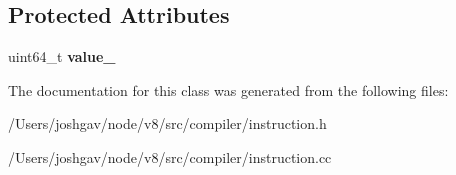 \subsection*{Protected Attributes}
\begin{DoxyCompactItemize}
\item 
uint64\+\_\+t {\bfseries value\+\_\+}\hypertarget{classv8_1_1internal_1_1compiler_1_1_instruction_operand_a4152277dc0b28ea539e0aab97dfff29b}{}\label{classv8_1_1internal_1_1compiler_1_1_instruction_operand_a4152277dc0b28ea539e0aab97dfff29b}

\end{DoxyCompactItemize}


The documentation for this class was generated from the following files\+:\begin{DoxyCompactItemize}
\item 
/\+Users/joshgav/node/v8/src/compiler/instruction.\+h\item 
/\+Users/joshgav/node/v8/src/compiler/instruction.\+cc\end{DoxyCompactItemize}
